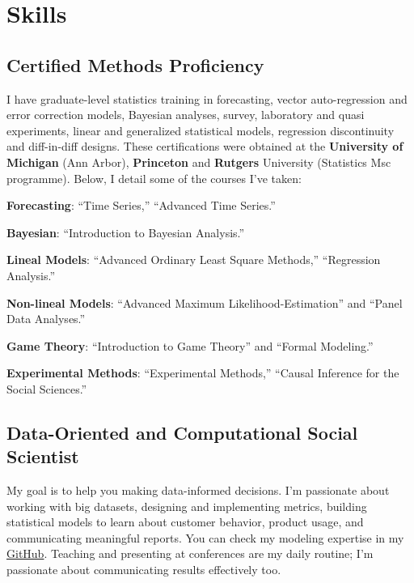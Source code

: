 \documentclass[letterpaper]{article}
\renewenvironment{itemize}{
  \begin{list}{}{
    \setlength{\leftmargin}{1.5em}
  }
}{
  \end{list}
}
\begin{document}
\section*{Skills}


\subsection*{Certified Methods Proficiency}

I have graduate-level statistics training in forecasting, vector auto-regression and error correction models, Bayesian analyses, survey, laboratory and quasi experiments, linear and generalized statistical models, regression discontinuity and diff-in-diff designs. These certifications were obtained at the {\bf University of Michigan} (Ann Arbor), {\bf Princeton} and {\bf Rutgers} University (Statistics Msc programme). Below, I detail some of the courses I've taken:

\begin{itemize}
	\item[-] {\bf Forecasting}: ``Time Series,'' ``Advanced Time Series.''
	\item[-] {\bf Bayesian}: ``Introduction to Bayesian Analysis.'' 
	\item[-] {\bf Lineal Models}: ``Advanced Ordinary Least Square Methods,'' ``Regression Analysis.''
	\item[-] {\bf Non-lineal Models}: ``Advanced Maximum Likelihood-Estimation'' and ``Panel Data Analyses.''
	\item[-] {\bf Game Theory}: ``Introduction to Game Theory'' and ``Formal Modeling.''
	\item[-] {\bf Experimental Methods}: ``Experimental Methods,'' ``Causal Inference for the Social Sciences.''
\end{itemize}


\subsection*{Data-Oriented and Computational Social Scientist}
My goal is to help you making data-informed decisions. 
I'm passionate about working with big datasets, designing and implementing metrics, building statistical models to learn about customer behavior, product usage, and communicating meaningful reports. You can check my modeling expertise in my \href{https://github.com/hbahamonde}{GitHub}. Teaching and presenting at conferences are my daily routine; I'm passionate about communicating results effectively too.
\end{document}
